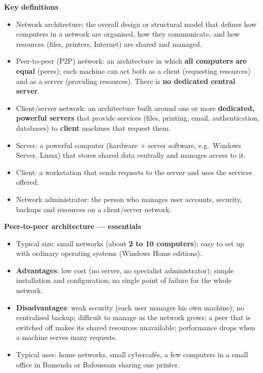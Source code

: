 \documentclass[11pt]{article}
\newcommand{\cle}[1]{{\popxbold\color{popdark}#1}}
\begin{document}
\begin{bilan}
\textbf{Key definitions}
\begin{itemize}
\item \cle{Network architecture}: the overall design or structural model that defines how computers in a network are organised, how they communicate, and how resources (files, printers, Internet) are shared and managed.
\item \cle{Peer-to-peer (P2P) network}: an architecture in which \textbf{all computers are equal} (peers); each machine can act both as a client (requesting resources) and as a server (providing resources). There is \textbf{no dedicated central server}.
\item \cle{Client/server network}: an architecture built around one or more \textbf{dedicated, powerful servers} that provide services (files, printing, email, authentication, databases) to \textbf{client} machines that request them.
\item \cle{Server}: a powerful computer (hardware + server software, e.g.\ Windows Server, Linux) that stores shared data centrally and manages access to it.
\item \cle{Client}: a workstation that sends requests to the server and uses the services offered.
\item \cle{Network administrator}: the person who manages user accounts, security, backups and resources on a client/server network.
\end{itemize}

\textbf{Peer-to-peer architecture — essentials}
\begin{itemize}
\item Typical size: small networks (about \textbf{2 to 10 computers}); easy to set up with ordinary operating systems (Windows Home editions).
\item \textbf{Advantages}: low cost (no server, no specialist administrator); simple installation and configuration; no single point of failure for the whole network.
\item \textbf{Disadvantages}: weak security (each user manages his own machine); no centralised backup; difficult to manage as the network grows; a peer that is switched off makes its shared resources unavailable; performance drops when a machine serves many requests.
\item Typical uses: home networks, small cybercaf\'es, a few computers in a small office in Bamenda or Bafoussam sharing one printer.
\end{itemize}


\end{bilan}
\end{document}
